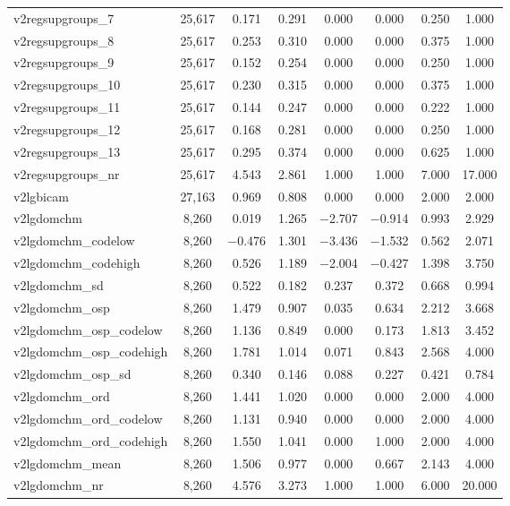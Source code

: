 \begin{table}[!htbp]
\begin{tabular}{@{\extracolsep{5pt}}lccccccc}
v2regsupgroups\_7 & 25,617 & 0.171 & 0.291 & 0.000 & 0.000 & 0.250 & 1.000 \\ 
v2regsupgroups\_8 & 25,617 & 0.253 & 0.310 & 0.000 & 0.000 & 0.375 & 1.000 \\ 
v2regsupgroups\_9 & 25,617 & 0.152 & 0.254 & 0.000 & 0.000 & 0.250 & 1.000 \\ 
v2regsupgroups\_10 & 25,617 & 0.230 & 0.315 & 0.000 & 0.000 & 0.375 & 1.000 \\ 
v2regsupgroups\_11 & 25,617 & 0.144 & 0.247 & 0.000 & 0.000 & 0.222 & 1.000 \\ 
v2regsupgroups\_12 & 25,617 & 0.168 & 0.281 & 0.000 & 0.000 & 0.250 & 1.000 \\ 
v2regsupgroups\_13 & 25,617 & 0.295 & 0.374 & 0.000 & 0.000 & 0.625 & 1.000 \\ 
v2regsupgroups\_nr & 25,617 & 4.543 & 2.861 & 1.000 & 1.000 & 7.000 & 17.000 \\ 
v2lgbicam & 27,163 & 0.969 & 0.808 & 0.000 & 0.000 & 2.000 & 2.000 \\ 
v2lgdomchm & 8,260 & 0.019 & 1.265 & $-$2.707 & $-$0.914 & 0.993 & 2.929 \\ 
v2lgdomchm\_codelow & 8,260 & $-$0.476 & 1.301 & $-$3.436 & $-$1.532 & 0.562 & 2.071 \\ 
v2lgdomchm\_codehigh & 8,260 & 0.526 & 1.189 & $-$2.004 & $-$0.427 & 1.398 & 3.750 \\ 
v2lgdomchm\_sd & 8,260 & 0.522 & 0.182 & 0.237 & 0.372 & 0.668 & 0.994 \\ 
v2lgdomchm\_osp & 8,260 & 1.479 & 0.907 & 0.035 & 0.634 & 2.212 & 3.668 \\ 
v2lgdomchm\_osp\_codelow & 8,260 & 1.136 & 0.849 & 0.000 & 0.173 & 1.813 & 3.452 \\ 
v2lgdomchm\_osp\_codehigh & 8,260 & 1.781 & 1.014 & 0.071 & 0.843 & 2.568 & 4.000 \\ 
v2lgdomchm\_osp\_sd & 8,260 & 0.340 & 0.146 & 0.088 & 0.227 & 0.421 & 0.784 \\ 
v2lgdomchm\_ord & 8,260 & 1.441 & 1.020 & 0.000 & 0.000 & 2.000 & 4.000 \\ 
v2lgdomchm\_ord\_codelow & 8,260 & 1.131 & 0.940 & 0.000 & 0.000 & 2.000 & 4.000 \\ 
v2lgdomchm\_ord\_codehigh & 8,260 & 1.550 & 1.041 & 0.000 & 1.000 & 2.000 & 4.000 \\ 
v2lgdomchm\_mean & 8,260 & 1.506 & 0.977 & 0.000 & 0.667 & 2.143 & 4.000 \\ 
v2lgdomchm\_nr & 8,260 & 4.576 & 3.273 & 1.000 & 1.000 & 6.000 & 20.000 \\ 

\end{tabular}
\end{table}
